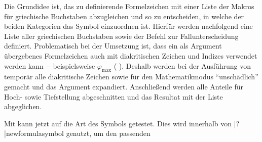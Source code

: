 \documentclass[%
  english,ngerman,%
  cdgeometry=no,DIV=12,%
  cd=false,cdfont=false,cdtitle=true,%
  headings=normal,%
  automark,%
  listof=toc,%
]{tudscrartcl}
\begin{document}
Die Grundidee ist, das zu definierende Formelzeichen mit einer Liste der Makros 
für griechische Buchstaben abzugleichen und so zu entscheiden, in welche der 
beiden Kategorien das Symbol einzuordnen ist. Hierfür werden nachfolgend eine 
Liste  aller griechischen Buchstaben sowie der Befehl 
zur Fallunterscheidung definiert. Problematisch bei der Umsetzung ist, dass ein 
als Argument übergebenes Formelzeichen auch mit diakritischen Zeichen und 
Indizes verwendet werden kann~-- beispielsweise $\dot{\varphi}_{\mathrm{max}}$
(%
  \PValue{\textunderscore}%
). Deshalb werden bei der Ausführung von  temporär alle 
diakritische Zeichen sowie  für den Mathematikmodus 
\enquote{unschädlich} gemacht und das Argument  expandiert. 
Anschließend werden alle Anteile für Hoch- sowie Tiefstellung abgeschnitten und 
das Resultat mit der Liste  abgeglichen.
%
\CodeHook{\let\newcommand\renewcommand}
\begin{Hint*}
\makeatletter
\newcommand*\greeksymbollist{}
\def\@tempa#1{\ifdefvoid{#1}{}{\listadd\greeksymbollist{#1}}}
\forcsvlist{\@tempa}{%
  \alpha,\beta,\varbeta,\gamma,\delta,\epsilon,\varepsilon,\zeta,%
  \eta,\theta,\vartheta,\iota,\kappa,\varkappa,\lambda,\mu,\nu,%
  \xi,\omicron,\pi,\varpi,\rho,\varrho,\sigma,\varsigma,\tau,%
  \upsilon,\phi,\varphi,\chi,\psi,\omega,%
  \Alpha,\Beta,\Gamma,\Delta,\Epsilon,\Zeta,\Eta,\Theta,\Iota,%
  \Kappa,\Lambda,\Mu,\Nu,\Xi,\Omicron,\Pi,\Rho,\Sigma,\Tau,\Upsilon,%
  \Phi,\Chi,\Psi,\Omega%
}
\newcommand*\ifisgreeksymbol[1]{%
  \begingroup%
    \def\@tempa##1{\let##1\@firstofone}%
    \forcsvlist{\@tempa}{%
      \acute,\bar,\breve,\check,\dot,\ddot,\dddot,\ddddot,%
      \hat,\widehat,\grave,\tilde,\widetilde,\vec,%
      \Acute,\Bar,\Breve,\Check,\Dot,\Ddot,\Hat,\Grave,\Tilde,\Vec%
    }%
    \def\boldsymbol{}%
    \protected@edef\@tempa{#1}%
    \def\@tempb##1_##2\relax{\def\@tempa{##1}}%
    \expandafter\@tempb\@tempa_\relax\relax%
    \def\@tempb##1^##2\relax{\def\@tempa{##1}}%
    \expandafter\@tempb\@tempa^\relax\relax%
    \expandafter\ifinlist\expandafter{\@tempa}{\greeksymbollist}{%
      \aftergroup\@firstoftwo%
    }{%
      \aftergroup\@secondoftwo%
    }%
  \endgroup%
}
\makeatother
\end{Hint*}
%
Mit  kann jetzt auf die Art des Symbols getestet. Dies 
wird innerhalb von \Macro|?|{newformulasymbol} genutzt, um den passenden 
\end{document}
